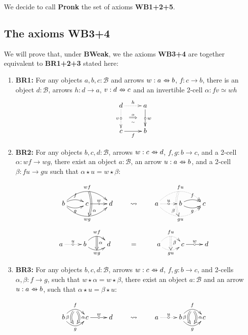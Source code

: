 \documentclass{article}
\numberwithin{equation}{section}
\theoremstyle{definition}
\theoremstyle{plain}
\newcommand{\wto}{\to \hspace{-1.1em} \circ \hspace{0.6em}}
\begin{document}
We decide to call \textbf{Pronk} the set of axioms \textbf{WB1+2+5}.

\subsection{The axioms \textbf{WB3+4}}

We will prove that, under \textbf{BWeak}, we the axioms \textbf{WB3+4} are together equivalent to \textbf{BR1+2+3} stated here:

\begin{enumerate}[label = $\bullet$]
	\item \textbf{BR1:} For any objects $a,b,c:\mathcal{B}$ and arrows $w: a \wto b$, $f: c \to b$, there is an object $d:\mathcal{B}$, arrows $h: d \to a$, $v: d \wto c$ and an invertible 2-cell $\alpha: fv \simeq wh$ \[\xymatrix{d \ar@{.>}[r]^h \ar@{.>}[d]_v|{\circ} \ar@{}[dr]|{\overset{\alpha}{\underset{\sim}{\Longrightarrow}}}& a\ar[d]^w|{\circ}\\c \ar[r]_f & b}\]
	\item \textbf{BR2:} For any objects $b,c,d:\mathcal{B}$, arrows $w: c \wto d$, $f,g: b \to c$, and a 2-cell $\alpha: wf \to wg$,  there exist an object $a:\mathcal{B}$, an arrow $u: a \wto b$, and a 2-cell $\beta: fu \to gu$   such that $\alpha \star u = w \star \beta$:
	
	\[\xymatrix{
		b \ar@/^/[r]^f \ar@/_/[r]_g \ar@/^1.5pc/[rr]^{wf}="1" \ar@/_1.5pc/[rr]_{wg}="2" & c \ar[r]^w|{\circ} & d \ar@/^/@{=>}^(0.7){\alpha}"1";"2"
	}
	\qquad \leadsto \qquad
	\xymatrix{
		a\ar@{.>}[r]^u|{\circ} \ar@{.>}@/^1.5pc/[rr]^{fu}="1" \ar@{.>}@/_1.5pc/[rr]_{gu}="2" & b \ar@/^/[r]^f \ar@/_/[r]_g & c \ar@/_/@{:>}_(0.7){\beta}"1";"2"
	}
	\]
	\[
	\xymatrix{
		a \ar@{.>}[r]^u|{\circ}  & b \ar@/^1pc/[r]^{wf}="1" \ar@/_0.7pc/[r]_{wg}="2" & d & = & a \ar@{.>}@/^1pc/[r]^{fu}="3" \ar@{.>}@/_0.7pc/[r]_{gu}="4" & c \ar[r]^w|{\circ} & d \ar@{=>}^{\alpha}"1";"2"\ar@{:>}^{\beta}"3";"4"
	}
	\]
	\item \textbf{BR3:} For any objects $b,c,d:\mathcal{B}$, arrows $w: c \wto d$, $f,g: b \to c$, and 2-cells $\alpha, \beta: f \to g$,  such that $w \star \alpha = w \star \beta$, there exist an object $a:\mathcal{B}$ and an arrow $u: a \wto b$, such that $\alpha \star u = \beta \star u$:
	
	\[\xymatrix{
		b \ar@/^1pc/[r]^f_{}="1" \ar@/_1pc/[r]_g^{}="2" & c \ar[r]^w|{\circ} & d \ar@/^/@{=>}^{\alpha}"1";"2" \ar@/_/@{=>}_{\beta}"1";"2"
	}
	\qquad \leadsto \qquad
	\xymatrix{
		a\ar@{.>}[r]^u|{\circ} & b \ar@/^1pc/[r]^f_{}="1" \ar@/_1pc/[r]_g^{}="2" & c \ar@/^/@{=>}^{\alpha}"1";"2" \ar@/_/@{=>}_{\beta}"1";"2"
	}
	\]
\end{enumerate}
\end{document}
